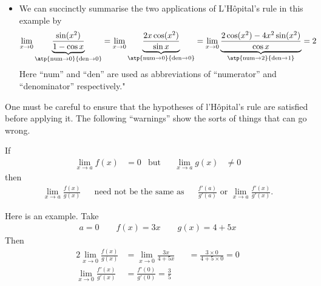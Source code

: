 \begin{eg}
\begin{itemize}
\item We can succinctly summarise the two applications of L'H\^opital's rule in
this example by
\begin{align*}
\lim_{x\to 0}\underbrace{\frac{\sin(x^2)}{1-\cos x}}_{\atp
        {\mathrm{num}\to 0}
        {\mathrm{den}\to 0}}
&=\lim_{x\to 0}\underbrace{\frac{2x\cos(x^2)}{\sin x}}_{\atp
        {\mathrm{num}\to 0}
        {\mathrm{den}\to 0}}
=\lim_{x\to 0}\underbrace{\frac{2\cos(x^2)-4x^2\sin(x^2)}{\cos x}}_{\atp
        {\mathrm{num}\to 2}
        {\mathrm{den}\to 1}}
=2
\end{align*}
Here ``num'' and ``den'' are used as abbreviations of ``numerator'' and
``denominator'' respectively."

\end{itemize}
\end{eg}

One must be careful to ensure that the hypotheses of l'H\^opital's rule are
satisfied before applying it. The following ``warnings'' show the sorts of
things that can go wrong.

\begin{warning}\label{warning:lhopital1}
If
\begin{align*}
\lim\limits_{x\rightarrow a}f(x)&=0 & \text{but}&&
\lim\limits_{x\rightarrow a}g(x)&\ne 0
\end{align*}
then
\begin{align*}
\lim\limits_{x\rightarrow a}\frac{f(x)}{g(x)}
&& \text{need not be the same as} &&
\frac{f'(a)}{g'(a)}
\text{ or }
\lim\limits_{x\rightarrow a}\frac{f'(x)}{g'(x)}.
\end{align*}

Here is an example. Take
\begin{align*}
a=0\qquad  f(x)=3x \qquad g(x)=4+5x
\end{align*}
Then
\begin{alignat*}{2}
\lim_{x\rightarrow 0}\frac{f(x)}{g(x)}
&=\lim_{x\rightarrow 0}\frac{3x}{4+5x} &
&=\frac{3\times 0}{4+5\times 0}
=0\\[0.1in]
\lim_{x\rightarrow 0}\frac{f'(x)}{g'(x)}
&= \frac{f'(0)}{g'(0)}
=\frac{3}{5}
\end{alignat*}
\end{warning}

